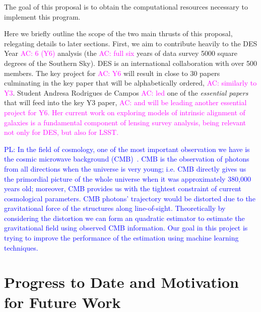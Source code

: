 \documentclass[12pt]{article}
\newcommand{\acampos}[1]{\textcolor{magenta}{AC: #1}}
\newcommand{\peikai}[1]{\textcolor{blue}{PL: #1}}
\begin{document}
\begin{small}
The goal of this proposal is to obtain the computational resources necessary to implement this program.

Here we briefly outline the scope of the two main thrusts of this proposal, relegating details to later sections. First, we aim to contribute heavily to the DES Year \acampos{6 (Y6)} analysis (the \acampos {full six} years of data survey 5000 square degrees of the Southern Sky). DES is an international collaboration with over 500 members. The key project for \acampos{Y6} will result in close to 30 papers culminating in the key paper that will be alphabetically ordered, \acampos{similarly to Y3}. 
Student Andresa Rodrigues de Campos \acampos{led} one of the {\it essential papers} \cite{y3-tensions} that will feed into the key Y3 paper, \acampos{and will be leading another essential project for Y6. Her current work on exploring models of intrinsic alignment of galaxies is a fundamental component of lensing survey analysis, being relevant not only for DES, but also for LSST.}

\peikai{In the field of cosmology, one of the most important observation we have is the cosmic microwave background (CMB)~\cite{Dodelson:2003ft}. CMB is the observation of photons from all directions when the universe is very young; i.e. CMB directly gives us the primordial picture of the whole universe when it was approximately 380,000 years old; moreover, CMB provides us with the tightest constraint of current cosmological parameters. CMB photons' trajectory would be distorted due to the gravitational force of the structures along line-of-sight. Theoretically by considering the distortion we can form an quadratic estimator to estimate the gravitational field using observed CMB information. Our goal in this project is trying to improve the performance of the estimation using machine learning techniques.}

\section{Progress to Date and Motivation for Future Work}





\end{small}
\end{document}
